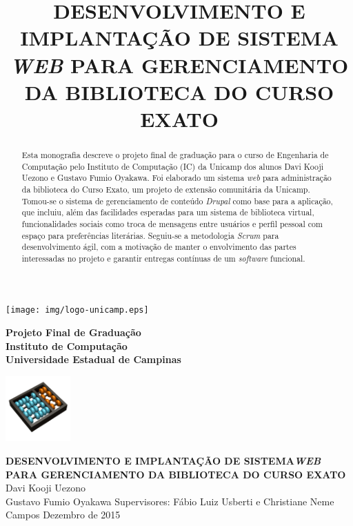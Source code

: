 \documentclass[a4paper]{article}
\title{DESENVOLVIMENTO E IMPLANTAÇÃO DE SISTEMA \textit{WEB} PARA GERENCIAMENTO DA BIBLIOTECA DO CURSO EXATO}
\begin{document}
\begin{minipage}[t|]{14mm}
\texttt{[image: img/logo-unicamp.eps]}
\end{minipage}
\hfill
\begin{minipage}[tl]{120mm}
\begin{center}
{\bf \sc Projeto Final de Graduação}\\
{\bf \sc Instituto de Computação} \\
{\bf \sc Universidade Estadual de Campinas} \\
\end{center}
\end{minipage}
\hfill
\begin{minipage}[c]{25mm}
\thispagestyle{empty}
\hspace{-0.5cm}
\includegraphics[width=25mm]{img/logo-ic.png}
\end{minipage}
\vfill\vfill\vfill
\begin{center}
\LARGE{\textbf{DESENVOLVIMENTO E IMPLANTAÇÃO DE SISTEMA\textit{WEB} PARA GERENCIAMENTO DA BIBLIOTECA DO CURSO EXATO}}
\vfill\vfill
\Large{Davi Kooji Uezono\\Gustavo Fumio Oyakawa}
\vfill
\large{Supervisores: Fábio Luiz Usberti e Christiane Neme Campos}
\vfill\vfill
\large{Dezembro de 2015}
\end{center}
\vfill

\pagebreak
{}
\begin{abstract}
\normalsize
Esta monografia descreve o projeto final de graduação para o curso de Engenharia de Computação pelo Instituto de Computação (IC) da Unicamp dos alunos Davi Kooji Uezono e Gustavo Fumio Oyakawa. Foi elaborado um sistema \textit{web} para administração da biblioteca do Curso Exato, um projeto de extensão comunitária da Unicamp. Tomou-se o sistema de gerenciamento de conteúdo \textit{Drupal} como base para a aplicação, que incluiu, além das facilidades esperadas para um sistema de biblioteca virtual, funcionalidades sociais como troca de mensagens entre usuários e perfil pessoal com espaço para preferências literárias. Seguiu-se a metodologia \textit{Scrum} para desenvolvimento ágil, com a motivação de manter o envolvimento das partes interessadas no projeto e garantir entregas contínuas de um \textit{software} funcional.
\end{abstract}
\end{document}
